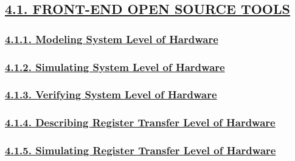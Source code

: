 \documentclass[
]{article}
\begin{document}
\hypertarget{front-end-open-source-tools}{%
\subsection{\texorpdfstring{\protect\hyperlink{front-end-open-source-tools-2}{4.1.
FRONT-END OPEN SOURCE
TOOLS}}{4.1. FRONT-END OPEN SOURCE TOOLS}}\label{front-end-open-source-tools}}

\hypertarget{modeling-system-level-of-hardware}{%
\subsubsection{\texorpdfstring{\protect\hyperlink{modeling-system-level-of-hardware-1}{4.1.1.
Modeling System Level of
Hardware}}{4.1.1. Modeling System Level of Hardware}}\label{modeling-system-level-of-hardware}}

\hypertarget{simulating-system-level-of-hardware}{%
\subsubsection{\texorpdfstring{\protect\hyperlink{simulating-system-level-of-hardware-1}{4.1.2.
Simulating System Level of
Hardware}}{4.1.2. Simulating System Level of Hardware}}\label{simulating-system-level-of-hardware}}

\hypertarget{verifying-system-level-of-hardware}{%
\subsubsection{\texorpdfstring{\protect\hyperlink{verifying-system-level-of-hardware-1}{4.1.3.
Verifying System Level of
Hardware}}{4.1.3. Verifying System Level of Hardware}}\label{verifying-system-level-of-hardware}}

\hypertarget{describing-register-transfer-level-of-hardware}{%
\subsubsection{\texorpdfstring{\protect\hyperlink{describing-register-transfer-level-of-hardware-1}{4.1.4.
Describing Register Transfer Level of
Hardware}}{4.1.4. Describing Register Transfer Level of Hardware}}\label{describing-register-transfer-level-of-hardware}}

\hypertarget{simulating-register-transfer-level-of-hardware}{%
\subsubsection{\texorpdfstring{\protect\hyperlink{simulating-register-transfer-level-of-hardware-1}{4.1.5.
Simulating Register Transfer Level of
Hardware}}{4.1.5. Simulating Register Transfer Level of Hardware}}\label{simulating-register-transfer-level-of-hardware}}
\end{document}
